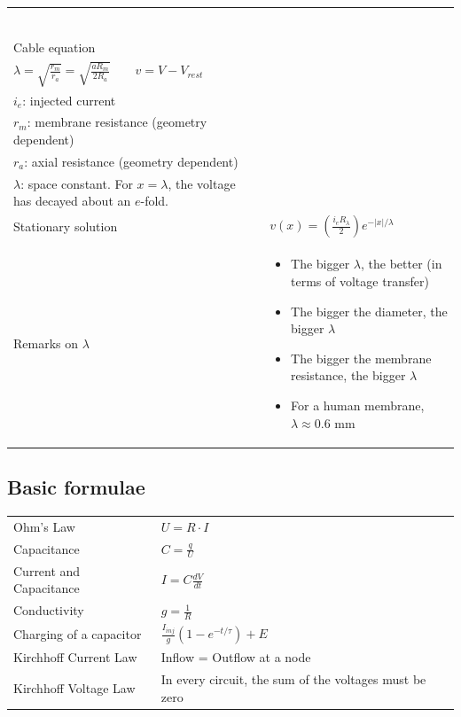 \begin{longtable}{p{4cm}p{15cm}}
\begin{tabular}[t]{p{14cm}}
			  \end{tabular}\\
Cable equation		& \begin{tabular}[t]{l}
			   $\boxed{\tau \left(\frac{\partial v}{\partial t} \right) = \lambda^2 \left( \frac{\partial^2v}{\partial x^2} \right) - v + r_m i_e}$\\
			   $\lambda = \sqrt{\frac{r_m}{r_a}} = \sqrt{\frac{a R_m}{2 R_a}}\qquad v = V-V_{rest}$\\
			   $i_e$: injected current\\
			   $r_m$: membrane resistance (geometry dependent)\\
			   $r_a$: axial resistance (geometry dependent)\\
			   $\lambda$: space constant. For $x=\lambda$, the voltage has decayed about an $e$-fold.
			  \end{tabular}\\
Stationary solution	& $\boxed{v(x) = \left( \frac{i_e R_{\lambda}}{2} \right) e^{-|x| / \lambda}}$\\
Remarks on $\lambda$& \begin{itemize}
				\item The bigger $\lambda$, the better (in terms of voltage transfer)
				\item The bigger the diameter, the bigger $\lambda$
				\item The bigger the membrane resistance, the bigger $\lambda$
				\item For a human membrane, $\lambda \approx 0.6$ mm
                           \end{itemize}
\end{longtable}
\subsection{Basic formulae}
\begin{tabular}{p{4cm}p{15cm}}
Ohm's Law	& $U = R \cdot I$\\
Capacitance	& $C = \frac{q}{U}$\\
Current and Capacitance	& $I = C \frac{dV}{dt}$\\
Conductivity	& $g = \frac{1}{R}$\\
Charging of a capacitor	& $\frac{I_{inj}}{g}(1-e^{-t/\tau}) + E$\\
Kirchhoff Current Law	& Inflow = Outflow at a node\\
Kirchhoff Voltage Law	& In every circuit, the sum of the voltages must be zero
\end{tabular}